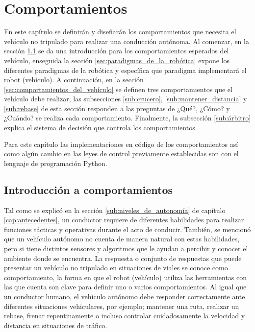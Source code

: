 \chapter{Comportamientos} \label{cap:comportamientos}
En este capítulo se definirán y diseñarán los comportamientos que necesita el vehículo no tripulado para realizar una conducción autónoma. Al comenzar, en la sección \ref{sec:introducción_a_comportamientos} se da una introducción para los comportamientos esperados del vehículo, enseguida la sección \ref{sec:paradigmas_de_la_robótica} expone los diferentes paradigmas de la robótica y específica que paradigma implementará el robot (vehículo). A continuación, en la sección \ref{sec:comportamientos_del_vehículo} se definen tres comportamientos que el vehículo debe realizar, las subsecciones \ref{sub:crucero}, \ref{sub:mantener_distancia} y \ref{sub:rebase} de esta sección responden a las preguntas de ¿Qué?, ¿Cómo? y ¿Cuándo? se realiza cada comportamiento. Finalmente, la subsección \ref{sub:árbitro} explica el sistema de decisión que controla los comportamientos.

Para este capítulo las implementaciones en código de los comportamientos así como algún cambio en las leyes de control previamente establecidas son con el lenguaje de programación Python.

\section{Introducción a comportamientos} \label{sec:introducción_a_comportamientos}

Tal como se explicó en la sección \ref{sub:niveles_de_autonomía} de capítulo \ref{cap:antecedentes}, un conductor requiere de diferentes habilidades para realizar funciones tácticas y operativas durante el acto de conducir. También, se mencionó que un vehículo autónomo no cuenta de manera natural con estas habilidades, pero si tiene distintos sensores y algoritmos que le ayudan a percibir y conocer el ambiente donde se encuentra. La respuesta o conjunto de respuestas que puede presentar un vehículo no tripulado en situaciones de viales se conoce como comportamiento, la forma en que el robot (vehículo) utiliza las herramientas con las que cuenta son clave para definir uno o varios comportamientos. Al igual que un conductor humano, el vehículo autónomo debe responder correctamente ante diferentes situaciones vehiculares, por ejemplo; mantener una ruta, realizar un rebase, frenar repentinamente o incluso controlar cuidadosamente la velocidad y distancia en situaciones de tráfico.

